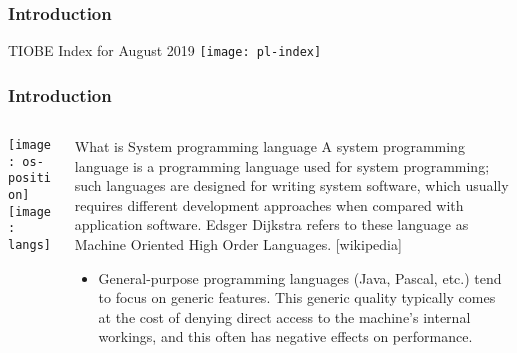\begin{frame}[plain]
	\frametitle{Introduction}

\centering
TIOBE Index for August 2019
\texttt{[image: pl-index]}
\end{frame}


\begin{frame}[plain]
	\frametitle{Introduction}
	
	
	
	\begin{columns}
		
		\begin{column}{.4\textwidth}
			
			\texttt{[image: os-position]}
			\texttt{[image: langs]}
		\end{column}
		
		\begin{column}{.6\textwidth}
			
			\begin{block}{What is System programming language}
				A system programming language is a programming language used for system programming; such languages are designed for writing system software, which usually requires different development approaches when compared with application software. Edsger Dijkstra refers to these language as Machine Oriented High Order Languages.  [wikipedia]
			\end{block} 
			
			
			\begin{itemize}
				\item General-purpose programming languages (Java, Pascal, etc.) tend to focus on generic features. This generic quality typically comes at the cost of denying direct access to the machine's internal workings, and this often has negative effects on performance.
				
			\end{itemize}
			
			
		\end{column}
		
		
	\end{columns}
	
	
\end{frame}




